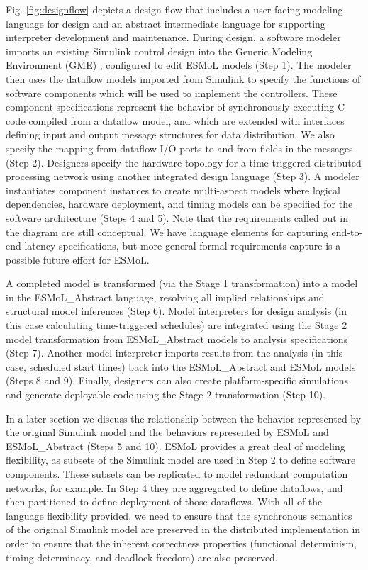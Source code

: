 Fig. \ref{fig:designflow} depicts a design flow that 
includes a user-facing modeling language 
for design and an abstract intermediate language for 
supporting interpreter development and
maintenance.  During design, a software modeler imports 
an existing Simulink control design into 
the Generic Modeling Environment (GME) \cite{mic:gme}, 
configured to edit ESMoL models (Step 1).  The modeler
then uses the dataflow models imported from Simulink
to specify the functions of software components
which will be used to implement the controllers.  These component
specifications represent the behavior of synchronously executing C code compiled from a dataflow model,  and which are extended with interfaces defining 
input and output message structures for data distribution. 
We also specify the mapping from dataflow I/O ports to and from fields 
in the messages (Step 2).  
Designers specify the hardware topology for a time-triggered 
distributed processing network using another integrated 
design language (Step 3).
A modeler instantiates component instances to create multi-aspect 
models where logical dependencies, hardware deployment, and timing 
models can be specified for the software architecture (Steps 4 and 5).
Note that the requirements called out in the diagram are still conceptual.  We have language elements for capturing end-to-end latency specifications, but more general formal requirements capture is a possible future effort for ESMoL.

A completed model is transformed (via the Stage 1 
transformation) into a model in the ESMoL\_Abstract 
language, resolving all implied relationships and structural 
model inferences (Step 6).  Model interpreters 
for design analysis (in this case calculating time-triggered 
schedules) are integrated using the Stage 2 model 
transformation from ESMoL\_Abstract models to analysis
specifications (Step 7).  Another model interpreter imports 
results from the analysis (in this case, scheduled start times) 
back into the ESMoL\_Abstract and ESMoL models (Steps 8 and 9).
Finally, designers can also create 
platform-specific simulations and generate deployable 
code using the Stage 2 transformation (Step 10).

In a later section we discuss the relationship between the behavior represented
by the original Simulink model and the behaviors represented by ESMoL and
ESMoL\_Abstract (Steps 5 and 10).  ESMoL provides a great deal of modeling
flexibility, as subsets of the Simulink model are used in Step 2 to 
define software components.  These subsets can be replicated to model 
redundant computation networks, for example.  In Step 4 they are aggregated to 
define dataflows, and then partitioned to define deployment of those dataflows.
With all of the language flexibility provided, we need to ensure that the 
synchronous semantics of the original Simulink model are preserved in
the distributed implementation in order to
ensure that the inherent correctness properties (functional determinism,
timing determinacy, and deadlock freedom) are also preserved.

